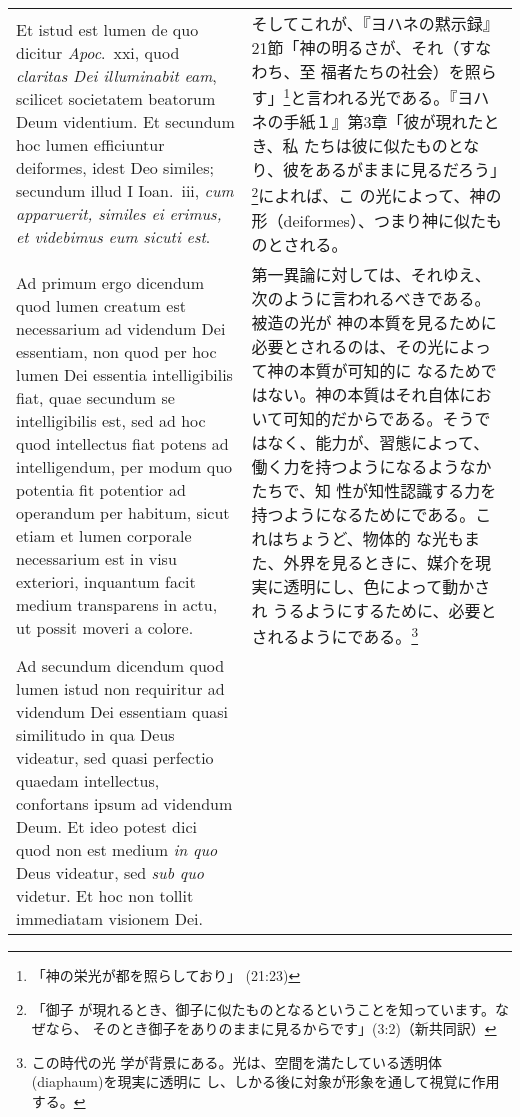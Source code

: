 \documentclass[10pt]{jsarticle} %
\begin{document}
\begin{longtable}{p{21em}p{21em}}
\\

Et istud est lumen de quo
dicitur {\it Apoc}.~{\sc xxi}, quod {\it claritas Dei illuminabit
eam}, scilicet societatem beatorum Deum videntium. Et secundum hoc
lumen efficiuntur deiformes, idest Deo similes; secundum illud I
Ioan.\ {\sc iii}, {\it cum apparuerit, similes ei erimus, et videbimus
eum sicuti est}.

&

そしてこれが、『ヨハネの黙示録』21節「神の明るさが、それ（すなわち、至
福者たちの社会）を照らす」\footnote{「神の栄光が都を照らしており」
(21:23)}と言われる光である。『ヨハネの手紙１』第3章「彼が現れたとき、私
たちは彼に似たものとなり、彼をあるがままに見るだろう」\footnote{「御子
が現れるとき、御子に似たものとなるということを知っています。なぜなら、
そのとき御子をありのままに見るからです」(3:2)（新共同訳）}によれば、こ
の光によって、神の形（deiformes）、つまり神に似たものとされる。

\\

{\sc Ad primum ergo dicendum} quod lumen creatum est necessarium ad
videndum Dei essentiam, non quod per hoc lumen Dei essentia
intelligibilis fiat, quae secundum se intelligibilis est, sed ad hoc
quod intellectus fiat potens ad intelligendum, per modum quo potentia
fit potentior ad operandum per habitum, sicut etiam et lumen corporale
necessarium est in visu exteriori, inquantum facit medium transparens
in actu, ut possit moveri a colore.

&

第一異論に対しては、それゆえ、次のように言われるべきである。被造の光が
神の本質を見るために必要とされるのは、その光によって神の本質が可知的に
なるためではない。神の本質はそれ自体において可知的だからである。そうで
はなく、能力が、習態によって、働く力を持つようになるようなかたちで、知
性が知性認識する力を持つようになるためにである。これはちょうど、物体的
な光もまた、外界を見るときに、媒介を現実に透明にし、色によって動かされ
うるようにするために、必要とされるようにである。\footnote{この時代の光
学が背景にある。光は、空間を満たしている透明体(diaphaum)を現実に透明に
し、しかる後に対象が形象を通して視覚に作用する。}

\\

{\sc Ad secundum dicendum} quod lumen istud non requiritur ad videndum
Dei essentiam quasi similitudo in qua Deus videatur, sed quasi
perfectio quaedam intellectus, confortans ipsum ad videndum Deum. Et
ideo potest dici quod non est medium {\it in quo} Deus videatur, sed
{\it sub quo} videtur. Et hoc non tollit immediatam visionem Dei.


\end{longtable}
\end{document}
